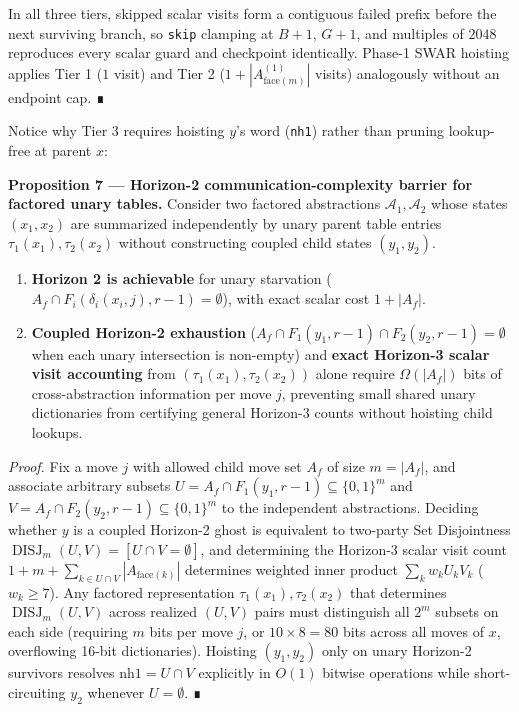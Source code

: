 \documentclass[10pt,twocolumn,letterpaper]{article}
\providecommand{\tightlist}{\setlength{\itemsep}{0pt}\setlength{\parskip}{0pt}}
\begin{document}
In all three tiers, skipped scalar visits form a contiguous failed
prefix before the next surviving branch, so \texttt{skip} clamping at
\(B+1\), \(G+1\), and multiples of \(2048\) reproduces every scalar
guard and checkpoint identically. Phase-1 SWAR hoisting applies Tier 1
(\(1\) visit) and Tier 2 (\(1 + |A_{\text{face}(m)}^{(1)}|\) visits)
analogously without an endpoint cap. ∎

Notice why Tier 3 requires hoisting \(y\)'s word (\texttt{nh1}) rather
than pruning lookup-free at parent \(x\):

\textbf{Proposition 7 --- Horizon-2 communication-complexity barrier for
factored unary tables.} Consider two factored abstractions
\(\mathcal A_1, \mathcal A_2\) whose states \((x_1, x_2)\) are
summarized independently by unary parent table entries
\(\tau_1(x_1), \tau_2(x_2)\) without constructing coupled child states
\((y_1, y_2)\).

\begin{enumerate}
\def\labelenumi{\arabic{enumi}.}
\tightlist
\item
  \textbf{Horizon 2 is achievable} for unary starvation
  (\(A_f \cap F_i(\delta_i(x_i,j), r-1) = \emptyset\)), with exact
  scalar cost \(1 + |A_f|\).
\item
  \textbf{Coupled Horizon-2 exhaustion}
  (\(A_f \cap F_1(y_1,r-1) \cap F_2(y_2,r-1) = \emptyset\) when each
  unary intersection is non-empty) and \textbf{exact Horizon-3 scalar
  visit accounting} from \((\tau_1(x_1), \tau_2(x_2))\) alone require
  \(\Omega(|A_f|)\) bits of cross-abstraction information per move
  \(j\), preventing small shared unary dictionaries from certifying
  general Horizon-3 counts without hoisting child lookups.
\end{enumerate}

\emph{Proof.} Fix a move \(j\) with allowed child move set \(A_f\) of
size \(m = |A_f|\), and associate arbitrary subsets
\(U = A_f \cap F_1(y_1, r-1) \subseteq \{0,1\}^m\) and
\(V = A_f \cap F_2(y_2, r-1) \subseteq \{0,1\}^m\) to the independent
abstractions. Deciding whether \(y\) is a coupled Horizon-2 ghost is
equivalent to two-party Set Disjointness
\(\operatorname{DISJ}_m(U, V) = [U \cap V = \emptyset]\), and
determining the Horizon-3 scalar visit count
\(1 + m + \sum_{k \in U \cap V} |A_{\text{face}(k)}|\) determines
weighted inner product \(\sum_{k} w_k U_k V_k\) (\(w_k \ge 7\)). Any
factored representation \(\tau_1(x_1), \tau_2(x_2)\) that determines
\(\operatorname{DISJ}_m(U,V)\) across realized \((U,V)\) pairs must
distinguish all \(2^m\) subsets on each side (requiring \(m\) bits per
move \(j\), or \(10 \times 8 = 80\) bits across all moves of \(x\),
overflowing 16-bit dictionaries). Hoisting \((y_1, y_2)\) only on unary
Horizon-2 survivors resolves \(\text{nh1} = U \cap V\) explicitly in
\(O(1)\) bitwise operations while short-circuiting \(y_2\) whenever
\(U = \emptyset\). ∎
\end{document}
